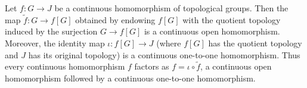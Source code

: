 Let $f: G \to J$ be a continuous homomorphism of topological groups. Then the map $\tilde{f}: G \to f[G]$ obtained by endowing $f[G]$ with the quotient topology induced by the surjection $G \to f[G]$ is a continuous open homomorphism. Moreover, the identity map $\iota: f[G] \to J$ (where $f[G]$ has the quotient topology and $J$ has its original topology) is a continuous one-to-one homomorphism. Thus every continuous homomorphism $f$ factors as $f = \iota \circ \tilde{f}$, a continuous open homomorphism followed by a continuous one-to-one homomorphism.
